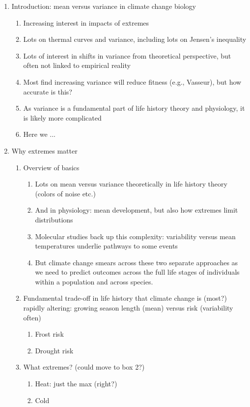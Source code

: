 \documentclass[11pt,letter]{article}
\begin{document}
\begin{enumerate}
\item Introduction: mean versus variance in climate change biology
\begin{enumerate}
\item Increasing interest in impacts of extremes
\item Lots on thermal curves and variance, including lots on Jensen's inequality
\item Lots of interest in shifts in variance from theoretical perspective, but often not linked to empirical reality
\item Most find increasing variance will reduce fitness (e.g., Vasseur), but how accurate is this?
\item As variance is a fundamental part of life history theory and physiology, it is likely more complicated
\item Here we ... 
\end{enumerate}
\item Why extremes matter
\begin{enumerate}
\item Overview of basics 
\begin{enumerate}
\item Lots on mean versus variance theoretically in life history theory (colors of noise etc.) 
\item And in physiology: mean development, but also how extremes limit distributions 
\item Molecular studies back up this complexity: variability versus mean temperatures underlie pathways to some events
\item But climate change smears across these two separate approaches as we need to predict outcomes across the full life stages of individuals within a population and across species. 
\end{enumerate}
\item Fundamental trade-off in life history that climate change is (most?) rapidly altering: growing season length (mean) versus risk (variability often)
\begin{enumerate}
\item Frost risk
\item Drought risk 
\end{enumerate}
\item What extremes? (could move to box 2?)
\begin{enumerate}
\item Heat: just the max (right?)
\item Cold

\end{enumerate}
\end{enumerate}
\end{enumerate}
\end{document}
